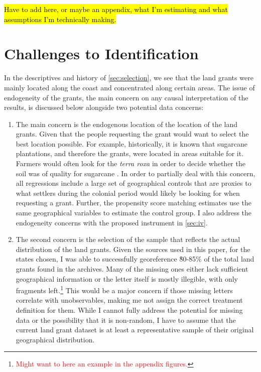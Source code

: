 \documentclass[11pt]{article}
\newcommand{\red}[1]{\textcolor{red}{#1}}
\begin{document}
\hl{Have to add here, or maybe an appendix, what I'm estimating and what assumptions I'm technically making.}

\section{Challenges to Identification}
\label{sec:challenges}

In the descriptives and history of \autoref{sec:selection}, we see that the land grants were mainly located along the coast and concentrated along certain areas.
The issue of endogeneity of the grants, the main concern on any causal interpretation of the results, is discussed below alongside two potential data concerns:

\begin{enumerate}
  \item The main concern is the endogenous location of the location of the land grants. Given that the people requesting the grant would want to select the best location possible. 
  For example, historically, it is known that sugarcane plantations, and therefore the grants, were located in areas suitable for it. 
  Farmers would often look for the \textit{terra roxa} in order to decide whether the soil was of quality for sugarcane \parencite{Schwartz1985-wf}.
  In order to partially deal with this concern, all regressions include a large set of geographical controls that are proxies to what settlers during the colonial period would likely be looking for when requesting a grant. 
  Further, the propensity score matching estimates use the same geographical variables to estimate the control group.
  I also address the endogeneity concerns with the proposed instrument in \autoref{sec:iv}.

  \item The second concern is the selection of the sample that reflects the actual distribution of the land grants. 
  Given the sources used in this paper, for the states chosen, I was able to successfully georeference \~80-85\% of the total land grants found in the archives. 
  Many of the missing ones either lack sufficient geographical information or the letter itself is mostly illegible, with only fragments left.\footnote{\red{Might want to here an example in the appendix figures.}}
  This would be a major concern if those missing letters correlate with unobservables, making me not assign the correct treatment definition for them.
  While I cannot fully address the potential for missing data or the possibility that it is non-random, I have to assume that the current land grant dataset is at least a representative sample of their original geographical distribution. 


\end{enumerate}
\end{document}
